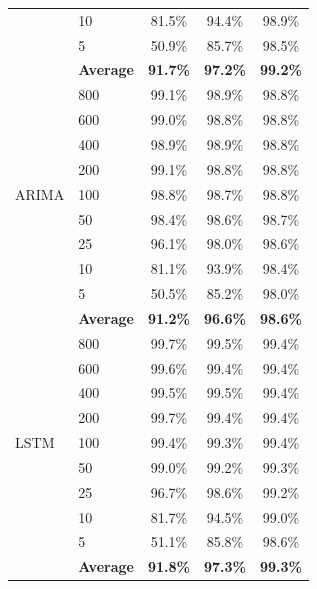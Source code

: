 \documentclass[11pt,a4paper]{article}
\begin{document}
\begin{table}[H]
\begin{tabular}{llccc}
 & 10  & 81.5\% & 94.4\% & 98.9\% \\
 & 5   & 50.9\% & 85.7\% & 98.5\% \\
 & \textbf{Average} & \textbf{91.7\%} & \textbf{97.2\%} & \textbf{99.2\%} \\
\midrule
\multirow{9}{*}{ARIMA}
 & 800 & 99.1\% & 98.9\% & 98.8\% \\
 & 600 & 99.0\% & 98.8\% & 98.8\% \\
 & 400 & 98.9\% & 98.9\% & 98.8\% \\
 & 200 & 99.1\% & 98.8\% & 98.8\% \\
 & 100 & 98.8\% & 98.7\% & 98.8\% \\
 & 50  & 98.4\% & 98.6\% & 98.7\% \\
 & 25  & 96.1\% & 98.0\% & 98.6\% \\
 & 10  & 81.1\% & 93.9\% & 98.4\% \\
 & 5   & 50.5\% & 85.2\% & 98.0\% \\
 & \textbf{Average} & \textbf{91.2\%} & \textbf{96.6\%} & \textbf{98.6\%} \\
\midrule
\multirow{9}{*}{LSTM}
 & 800 & 99.7\% & 99.5\% & 99.4\% \\
 & 600 & 99.6\% & 99.4\% & 99.4\% \\
 & 400 & 99.5\% & 99.5\% & 99.4\% \\
 & 200 & 99.7\% & 99.4\% & 99.4\% \\
 & 100 & 99.4\% & 99.3\% & 99.4\% \\
 & 50  & 99.0\% & 99.2\% & 99.3\% \\
 & 25  & 96.7\% & 98.6\% & 99.2\% \\
 & 10  & 81.7\% & 94.5\% & 99.0\% \\
 & 5   & 51.1\% & 85.8\% & 98.6\% \\
 & \textbf{Average} & \textbf{91.8\%} & \textbf{97.3\%} & \textbf{99.3\%} \\
\bottomrule
\end{tabular}
\end{table}
\end{document}
